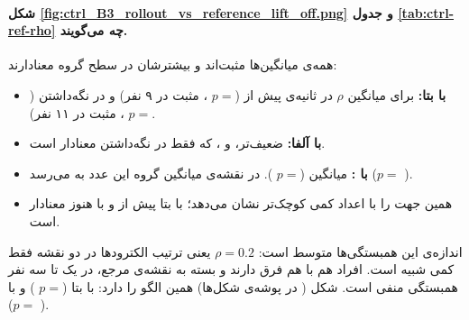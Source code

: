 



\paragraph{شکل \ref{fig:ctrl_B3_rollout_vs_reference_lift_off.png} و جدول \ref{tab:ctrl-ref-rho} چه می‌گویند.} همه‌ی میانگین‌ها مثبت‌اند و بیشترشان در سطح گروه معنادارند:
\begin{itemize}
\item \textbf{با  بتا:} برای  میانگین $\rho$  در ثانیه‌ی پیش از  ($p=$ ، مثبت در ۹ نفر) و  در نگه‌داشتن ($p=$ ، مثبت در ۱۱ نفر).
\item \textbf{با  آلفا:} ضعیف‌تر،  و ، که فقط در نگه‌داشتن معنادار است.
\item \textbf{با :} میانگین  ($p=$ ). در نقشه‌ی میانگین گروه این عدد به  می‌رسد ($p=$ ).
\item \textbf{} همین جهت را با اعداد کمی کوچک‌تر نشان می‌دهد؛ با  بتا پیش از  و با  هنوز معنادار است.
\end{itemize}
اندازه‌ی این همبستگی‌ها متوسط است: $\rho=0.2$ یعنی ترتیب الکترودها در دو نقشه فقط کمی شبیه است. افراد هم با هم فرق دارند و بسته به نقشه‌ی مرجع، در یک تا سه نفر همبستگی منفی است. شکل  ( در پوشه‌ی شکل‌ها) همین الگو را دارد: با  بتا  ($p=$ ) و با   ($p=$ ).


